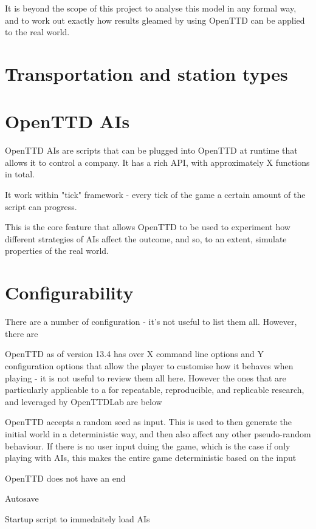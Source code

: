 \documentclass[logo,msc,dsti]{infthesis}    %
\begin{document}
{It is beyond the scope of this project to analyse this model in any formal way, and to work out exactly how results gleamed by using OpenTTD can be applied to the real world.

\section{Transportation and station types}

\section{OpenTTD AIs}

OpenTTD AIs are scripts that can be plugged into OpenTTD at runtime that allows it to control a company. It has a rich API, with approximately X functions in total.

It work within "tick" framework - every tick of the game a certain amount of the script can progress.

This is the core feature that allows OpenTTD to be used to experiment how different strategies of AIs affect the outcome, and so, to an extent, simulate properties of the real world.

\section{Configurability}

There are a number of configuration - it's not useful to list them all. However, there are 

OpenTTD as of version 13.4 has over X command line options and Y configuration options that allow the player to customise how it behaves when playing - it is not useful to review them all here. However the ones that are particularly applicable to a for repeatable, reproducible, and replicable research, and leveraged by OpenTTDLab are below

\begin{itemize}
\begin{item}
OpenTTD accepts a random seed as input. This is used to then generate the initial world in a deterministic way, and then also affect any other pseudo-random behaviour. If there is no user input duing the game, which is the case if only playing with AIs, this makes the entire game deterministic based on the input
\end{item}
\begin{item}
OpenTTD does not have an end
\end{item}
\begin{item}
Autosave
\end{item}
\begin{item}
Startup script to immedaitely load AIs 
\end{item}
\end{itemize}


}
\end{document}
